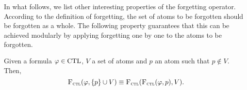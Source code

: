 \documentclass{article}
\begin{document}

In what follows, we list other interesting properties of the forgetting operator. According to the definition of forgetting, the set of atoms to be forgotten should be forgotten as a whole.
The following property guarantees that this can be achieved modularly by applying forgetting one by one to the atoms to be forgotten.
\begin{proposition}[Modularity]\label{disTF}
Given a formula $\varphi \in \textrm{CTL}$, $V$ a set of atoms and $p$ an atom such that $p \notin V$. Then,
\[
{\textsc{F}_{\textsc{ctl}}}(\varphi, \{p\} \cup V) \equiv {\textsc{F}_{\textsc{ctl}}}({\textsc{F}_{\textsc{ctl}}}(\varphi, p), V).
\]
\end{proposition}
\end{document}
